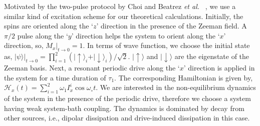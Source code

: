 \documentclass[prl,aps,preprint,floatfix]{revtex4-2}
\newcommand{\etal}{\textit{et al.\ }}
\newcommand{\stoo}{\vert_{t\rightarrow 0}}
\begin{document}
Motivated by the two-pulse protocol by Choi and Beatrez \etal
\cite{choi_observation_2017,beatrez_critical_2023}, we use a similar kind of excitation scheme for our
theoretical calculations. Initially, the spins are oriented along the `$z$' direction in the presence of the
Zeeman field. A $\pi/2$ pulse along the `$y$' direction helps the system to orient along the  `$x$'
direction, so, $M_x \stoo =1$. In terms of wave function, we choose the initial state as, $\vert\psi\rangle
\stoo = \prod_{i=1}^2 \left(\vert\uparrow \rangle_i + \vert\downarrow \rangle_i\right)/ \sqrt{2}$.
$\vert\uparrow \rangle$ and $\vert\downarrow \rangle$ are the eigenstate of the Zeeman basis. Next, a
resonant periodic drive along the `$x$' direction is applied in the system for a time duration of $\tau_1$.
The corresponding Hamiltonian is given by, $\mathcal{H}_x(t) = \sum\limits_{i=1}^2 \omega_1 I_{x}^i
\cos\omega_\circ t$. We are interested in the non-equilibrium dynamics of the system in the presence of the
periodic drive, therefore we choose a system having weak system-bath coupling. The dynamics is dominated by
decay from other sources, i.e., dipolar dissipation and drive-induced dissipation in this case.
\end{document}
